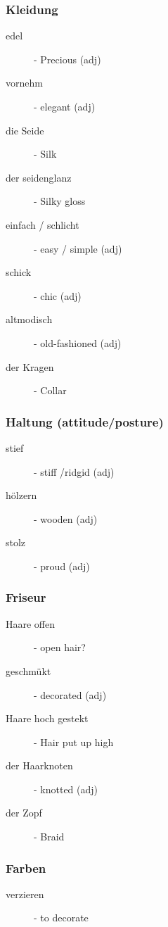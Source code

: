\documentclass{article}
\begin{document}
\subsubsection{Kleidung}
\begin{multicols}{2}
\begin{description}
\item[edel] - Precious (adj)
\item[vornehm] - elegant (adj)
\item[die Seide] - Silk
\item[der seidenglanz] - Silky gloss
\item[einfach / schlicht] - easy / simple (adj)
\item[schick] - chic (adj)
\item[altmodisch] - old-fashioned (adj)
\item[der Kragen] - Collar
\end{description}
\end{multicols}
\subsubsection{Haltung (attitude/posture)}
\begin{multicols}{2}
\begin{description}
\item[stief] - stiff /ridgid (adj)
\item[h\"olzern] - wooden (adj)
\item[stolz] - proud (adj)
\end{description}
\end{multicols}

\subsubsection{Friseur}
\begin{multicols}{2}
\begin{description}
\item[Haare offen] - open hair?
\item[geschmükt] - decorated (adj)
\item[Haare hoch gestekt] - Hair put up high
\item[der Haarknoten] - knotted (adj)
\item[der Zopf] - Braid
\end{description}
\end{multicols}

\subsubsection{Farben}
\begin{multicols}{2}
\begin{description}
\item[verzieren] - to decorate
\end{description}
\end{multicols}
\end{document}
